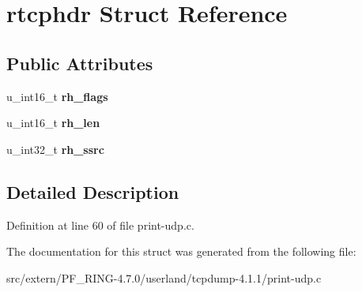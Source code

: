 \hypertarget{structrtcphdr}{
\section{rtcphdr Struct Reference}
\label{structrtcphdr}
}
\subsection*{Public Attributes}
\begin{DoxyCompactItemize}
\item 
\hypertarget{structrtcphdr_ac401d2fc105dc0d3b73fa39e914c5ee6}{
u\_\-int16\_\-t {\bfseries rh\_\-flags}}
\label{structrtcphdr_ac401d2fc105dc0d3b73fa39e914c5ee6}

\item 
\hypertarget{structrtcphdr_a157d3fb3a6a429547bdcb9efd744303e}{
u\_\-int16\_\-t {\bfseries rh\_\-len}}
\label{structrtcphdr_a157d3fb3a6a429547bdcb9efd744303e}

\item 
\hypertarget{structrtcphdr_ab4ba5080d89014e7fe6fa3787a1924ed}{
u\_\-int32\_\-t {\bfseries rh\_\-ssrc}}
\label{structrtcphdr_ab4ba5080d89014e7fe6fa3787a1924ed}

\end{DoxyCompactItemize}


\subsection{Detailed Description}


Definition at line 60 of file print-\/udp.c.



The documentation for this struct was generated from the following file:\begin{DoxyCompactItemize}
\item 
src/extern/PF\_\-RING-\/4.7.0/userland/tcpdump-\/4.1.1/print-\/udp.c\end{DoxyCompactItemize}
